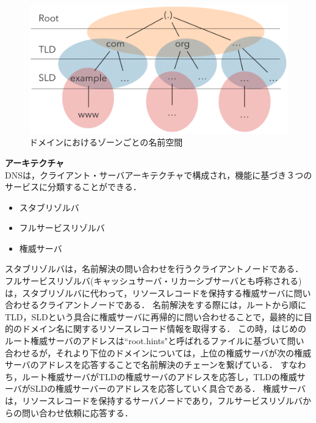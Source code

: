 \begin{figure}[h]
 \centering
 \includegraphics[width=12.0cm]{figure/dns-architecture.png}
 \caption{ドメインにおけるゾーンごとの名前空間}
 \label{fig:dns-architecture}
\end{figure}

\textbf{アーキテクチャ}\\
DNSは，クライアント・サーバアーキテクチャで構成され，機能に基づき３つのサービスに分類することができる．
\begin{itemize}
 \item スタブリゾルバ
 \vspace{-3mm}
 \item フルサービスリゾルバ
 \vspace{-3mm}
 \item 権威サーバ
\end{itemize}

スタブリゾルバは，名前解決の問い合わせを行うクライアントノードである．
フルサービスリゾルバ(キャッシュサーバ・リカーシブサーバとも呼称される)は，スタブリゾルバに代わって，リソースレコードを保持する権威サーバに問い合わせるクライアントノードである．
名前解決をする際には，ルートから順にTLD，SLDという具合に権威サーバに再帰的に問い合わせることで，最終的に目的のドメイン名に関するリソースレコード情報を取得する．
この時，はじめのルート権威サーバのアドレスは``root.hints"と呼ばれるファイルに基づいて問い合わせるが，それより下位のドメインについては，上位の権威サーバが次の権威サーバのアドレスを応答することで名前解決のチェーンを繋げている．
すなわち，ルート権威サーバがTLDの権威サーバのアドレスを応答し，TLDの権威サーバがSLDの権威サーバーのアドレスを応答していく具合である．
権威サーバは，リソースレコードを保持するサーバノードであり，フルサービスリゾルバからの問い合わせ依頼に応答する．


